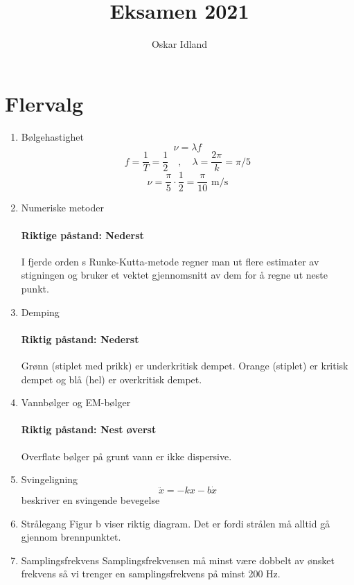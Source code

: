 \documentclass{article}
\author{Oskar Idland}
\title{Eksamen 2021}
\date{}
\begin{document}
\maketitle
\newpage

\section*{Flervalg}
  \begin{enumerate}
    \item Bølgehastighet 
      \[
      ν = λf
      \]
      \[
      f = \frac{1}{T} = \frac{1}{2} \quad , \quad λ = \frac{2π}{k} = π / 5
      \]
      \[
      ν = \frac{π}{5} \cdot \frac{1}{2} = \frac{π}{10} \text{ m/s}
      \] 


      \item Numeriske metoder
        \paragraph*{Riktige påstand: Nederst}
        I fjerde orden s Runke-Kutta-metode regner man ut flere estimater av stigningen og bruker et vektet gjennomsnitt av dem for å regne ut neste punkt. 
    

    \item Demping 
      \paragraph*{Riktig påstand: Nederst}
      Grønn (stiplet med prikk) er underkritisk dempet. Orange (stiplet) er kritisk dempet og blå (hel) er overkritisk dempet. 
    

    \item Vannbølger og EM-bølger 
      \paragraph*{Riktig påstand: Nest øverst}
      Overflate bølger på grunt vann er ikke dispersive. 
    

    \item Svingeligning 
      \[
      \ddot{x} = -kx - b \dot{x}
      \]
      beskriver en svingende bevegelse


    \item Strålegang %
      Figur b viser riktig diagram. Det er fordi strålen må alltid gå gjennom brennpunktet. 
      
    
    \item Samplingsfrekvens 
      Samplingsfrekvensen må minst være dobbelt av ønsket frekvens så vi trenger en samplingsfrekvens på minst 200 Hz.
      

\end{enumerate}
\end{document}
